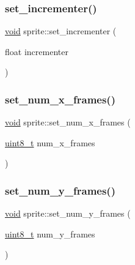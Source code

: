 \mbox{\label{classsprite_ae3c9856eee554bf235ea32433a9cda60}} 
\subsubsection{\texorpdfstring{set\+\_\+incrementer()}{set\_incrementer()}}
{\footnotesize\ttfamily \hyperlink{imgui__impl__opengl3__loader_8h_ac668e7cffd9e2e9cfee428b9b2f34fa7}{void} sprite\+::set\+\_\+incrementer (\begin{DoxyParamCaption}\item[{float}]{incrementer }\end{DoxyParamCaption})\hspace{0.3cm}{\ttfamily [inline]}}

\mbox{\label{classsprite_a94abe518a02e2ef3ae690ef3d19af461}} 
\subsubsection{\texorpdfstring{set\+\_\+num\+\_\+x\+\_\+frames()}{set\_num\_x\_frames()}}
{\footnotesize\ttfamily \hyperlink{imgui__impl__opengl3__loader_8h_ac668e7cffd9e2e9cfee428b9b2f34fa7}{void} sprite\+::set\+\_\+num\+\_\+x\+\_\+frames (\begin{DoxyParamCaption}\item[{\hyperlink{stdint_8h_aba7bc1797add20fe3efdf37ced1182c5}{uint8\+\_\+t}}]{num\+\_\+x\+\_\+frames }\end{DoxyParamCaption})\hspace{0.3cm}{\ttfamily [inline]}}

\mbox{\label{classsprite_a2396292b3f5ff37fbb0851b697237248}} 
\subsubsection{\texorpdfstring{set\+\_\+num\+\_\+y\+\_\+frames()}{set\_num\_y\_frames()}}
{\footnotesize\ttfamily \hyperlink{imgui__impl__opengl3__loader_8h_ac668e7cffd9e2e9cfee428b9b2f34fa7}{void} sprite\+::set\+\_\+num\+\_\+y\+\_\+frames (\begin{DoxyParamCaption}\item[{\hyperlink{stdint_8h_aba7bc1797add20fe3efdf37ced1182c5}{uint8\+\_\+t}}]{num\+\_\+y\+\_\+frames }\end{DoxyParamCaption})\hspace{0.3cm}{\ttfamily [inline]}}

